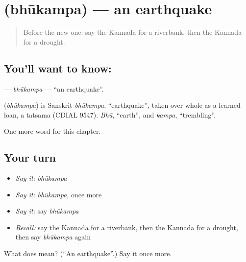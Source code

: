 \section[\texorpdfstring{\kn{ಭೂಕಂಪ} (bhūkampa)}{ಭೂಕಂಪ (bhūkampa)}]{ (bhūkampa) — an earthquake}

\label{lesson:KA-C287-bhukampa}



\begin{quote}
Before the new one: say the Kannada for a riverbank, then the Kannada for a drought.
\end{quote}

\subsection*{You'll want to know: }
\textbf{} — \emph{bhūkampa} — \textquotedblleft{}an earthquake\textquotedblright{}.

\begin{cousinweb}
\textbf{} (\emph{bhūkampa}) is Sanskrit \emph{bhūkampa}, \textquotedblleft{}earthquake\textquotedblright{}, taken over whole as a learned loan, a tatsama (CDIAL 9547). \emph{Bhū}, \textquotedblleft{}earth\textquotedblright{}, and \emph{kampa}, \textquotedblleft{}trembling\textquotedblright{}.
\end{cousinweb}

\begin{grammarlens}[title={What you've built}]
One more word for this chapter.
\end{grammarlens}

\subsection*{Your turn}
\begin{itemize}
\raggedright
  \item \emph{Say it:} \emph{bhūkampa}
  \item \emph{Say it:} \emph{bhūkampa}, once more
  \item \emph{Say it:} say \emph{bhūkampa}
  \item \emph{Recall:} say the Kannada for a riverbank, then the Kannada for a drought, then say \emph{bhūkampa} again
\end{itemize}

\begin{tcolorbox}[breakable,colback=teal!4,colframe=teal!35!black,title={Before you move on}]
What does  mean? (\textquotedblleft{}An earthquake\textquotedblright{}.) Say it once more.
\end{tcolorbox}
